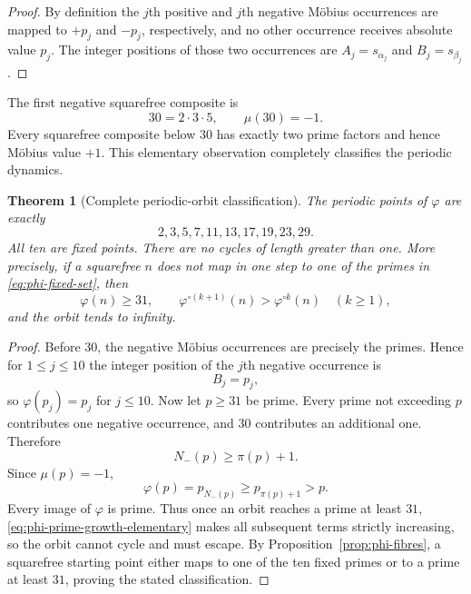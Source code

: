 \documentclass[11pt]{amsart}
\numberwithin{equation}{section}
\theoremstyle{plain}
\newtheorem{theorem}{Theorem}[section]
\theoremstyle{definition}
\theoremstyle{remark}
\begin{document}
\begin{proof}
By definition the $j$th positive and $j$th negative M\"obius occurrences are
mapped to $+p_j$ and $-p_j$, respectively, and no other occurrence receives
absolute value $p_j$.  The integer positions of those two occurrences are
$A_j=s_{\alpha_j}$ and $B_j=s_{\beta_j}$.
\end{proof}

The first negative squarefree composite is
\begin{equation}
\label{eq:first-negative-composite}
30=2\cdot3\cdot5,
\qquad \mu(30)=-1.
\end{equation}
Every squarefree composite below $30$ has exactly two prime factors and hence
M\"obius value $+1$.  This elementary observation completely classifies the
periodic dynamics.

\begin{theorem}[Complete periodic-orbit classification]
\label{thm:phi-dynamics}
The periodic points of $\varphi$ are exactly
\begin{equation}
\label{eq:phi-fixed-set}
\boxed{\;2,3,5,7,11,13,17,19,23,29.\;}
\end{equation}
All ten are fixed points.  There are no cycles of length greater than one.
More precisely, if a squarefree $n$ does not map in one step to one of the
primes in \eqref{eq:phi-fixed-set}, then
\begin{equation}
\label{eq:phi-eventual-monotone}
\varphi(n)\ge31,
\qquad
\varphi^{\circ(k+1)}(n)>\varphi^{\circ k}(n)
\quad(k\ge1),
\end{equation}
and the orbit tends to infinity.
\end{theorem}

\begin{proof}
Before $30$, the negative M\"obius occurrences are precisely the primes.
Hence for $1\le j\le10$ the integer position of the $j$th negative occurrence
is
\begin{equation}
\label{eq:B-first-ten-primes}
B_j=p_j,
\end{equation}
so $\varphi(p_j)=p_j$ for $j\le10$.  Now let $p\ge31$ be prime.  Every prime
not exceeding $p$ contributes one negative occurrence, and $30$ contributes an
additional one.  Therefore
\begin{equation}
\label{eq:Nminus-prime-lower}
N_-(p)\ge\pi(p)+1.
\end{equation}
Since $\mu(p)=-1$,
\begin{equation}
\label{eq:phi-prime-growth-elementary}
\varphi(p)=p_{N_-(p)}\ge p_{\pi(p)+1}>p.
\end{equation}
Every image of $\varphi$ is prime.  Thus once an orbit reaches a prime at least
$31$, \eqref{eq:phi-prime-growth-elementary} makes all subsequent terms
strictly increasing, so the orbit cannot cycle and must escape.  By
Proposition~\ref{prop:phi-fibres}, a squarefree starting point either maps to
one of the ten fixed primes or to a prime at least $31$, proving the stated
classification.
\end{proof}
\end{document}
